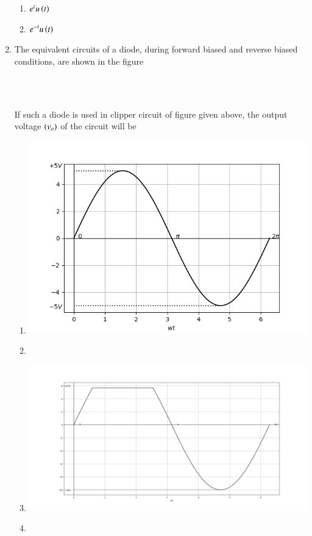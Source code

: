 \documentclass[journal]{IEEEtran}
\begin{document}
\begin{enumerate}
\begin{enumerate}
    \item $e^tu\left(t\right)$
    \item $e^{-t}u\left(t\right)$ \\
\end{enumerate}
\item The equivalent circuits of a diode, during forward biased and reverse biased conditions, are shown in the figure
\begin{figure}[!ht]
\centering
\resizebox{0.5\textwidth}{!}{%

}%
\end{figure}\\
\begin{figure}[!ht]
\centering
\resizebox{0.5\textwidth}{!}{%

}%
\end{figure}
\\
If such a diode is used in clipper circuit of figure given above, the output voltage $\left(v_o\right)$ of the circuit will be 
 \begin{enumerate}
     \item 
      \includegraphics[width=0.3\linewidth]{figs/A8.1.png}
        \item 
\resizebox{0.3\textwidth}{!}{%

}%
     \item 
      \includegraphics[width=0.3\linewidth]{figs/A8.3.png}
     \item 
\resizebox{0.3\textwidth}{!}{%

}%


\end{enumerate}
\end{enumerate}
\end{document}
